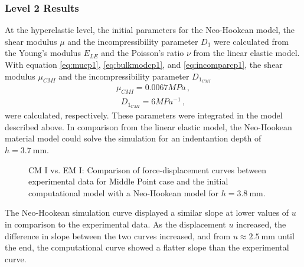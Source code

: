 \subsubsection*{Level 2 Results}
At the hyperelastic level, the initial parameters for the Neo-Hookean model, 
the shear modulus $\mu$ and the incompressibility parameter $D_1$ were calculated from the Young's modulus $E_{LE}$
and the Poisson's ratio $\nu$ from the linear elastic model. With equation \ref{eq:mucp1}, \ref{eq:bulkmodcp1}, 
and \ref{eq:incomparcp1}, the shear modulus $\mu_{CMI}$ and the incompressibility parameter $D_{1_{CMI}}$
\begin{align}
    \mu_{CMI} = 0.0067 MPa \, ,
    \label{eq:mucp1result}
\end{align}
\begin{align}
    D_{1_{CMI}} = 6 MPa^{-1} \, ,
    \label{eq:d1cp1result}
\end{align}
were calculated, respectively. These parameters were integrated in the model described above. In comparison from 
the linear elastic model, the Neo-Hookean material model could solve the simulation for an indentantion depth of 
$h =  \SI{3.7}{\milli \meter}$.
\begin{figure}%
    \centering
   \quad
   \caption[Computational model I vs. Experimental data - Neo-Hookean]{CM I vs. EM I: Comparison of force-displacement curves between experimental data for Middle Point case and the initial computational model with a Neo-Hookean model for $h = \SI{3.8}{\milli \meter}$.}%
   \label{fig:MPIvsCPINH}%
\end{figure}
The Neo-Hookean simulation curve displayed a similar slope at lower values of $u$ in comparison to the experimental data.
As the displacement $u$ increased, the difference in slope between the two curves increased, and from $u \approx \SI{2.5}{\milli \meter}$
until the end, the computational curve showed a flatter slope than the experimental curve.\\


